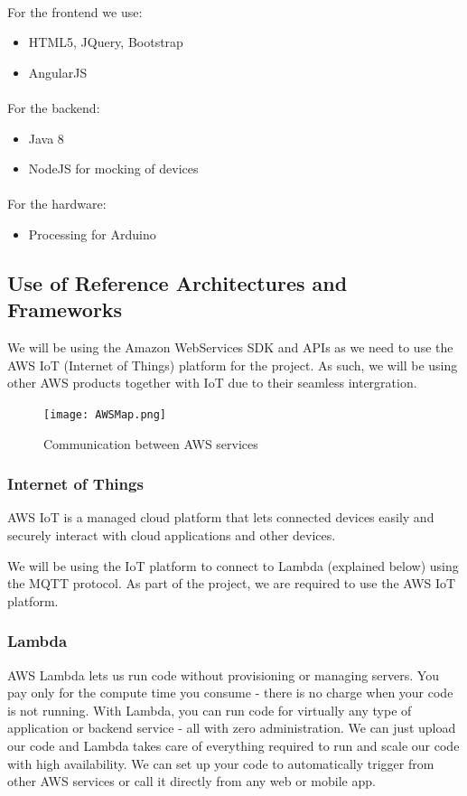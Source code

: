 \documentclass{article}
\begin{document}
	\paragraph{} For the frontend we use:
	\begin{itemize}
		\item HTML5, JQuery, Bootstrap
		\item AngularJS
	\end{itemize}
	
	
	\paragraph{}For the backend:
	\begin{itemize}
		\item Java 8
		\item NodeJS for mocking of devices
	\end{itemize}
	
	\paragraph{}For the hardware:
	\begin{itemize}
		\item Processing for Arduino
	\end{itemize}
	
	
\subsection{Use of Reference Architectures and Frameworks}
	We will be using the Amazon WebServices SDK and APIs as we need to use the AWS IoT (Internet of Things) platform for the project. As such, we will be using other AWS products together with IoT due to their seamless intergration.
		\begin{figure}[H]
			\centering
			\texttt{[image: AWSMap.png]}
			\caption{Communication between AWS services}
		\end{figure}
	\subsubsection{Internet of Things}
		AWS IoT is a managed cloud platform that lets connected devices easily and securely interact with cloud applications and other devices.
		
		We will be using the IoT platform to connect to Lambda (explained below) using the MQTT protocol. As part of the project, we are required to use the AWS IoT platform.
	\subsubsection{Lambda}
		AWS Lambda lets us run code without provisioning or managing servers. You pay only for the compute time you consume - there is no charge when your code is not running. With Lambda, you can run code for virtually any type of application or backend service - all with zero administration. We can just upload our code and Lambda takes care of everything required to run and scale our code with high availability. We can set up your code to automatically trigger from other AWS services or call it directly from any web or mobile app.
		
\end{document}
